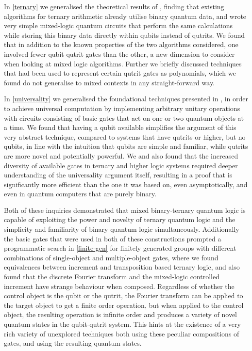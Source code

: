 In \autoref{ternary} we generalised the theoretical results of \cite{arithmetics}, finding that existing algorithms for ternary arithmetic already utilise binary quantum data, and wrote very simple mixed-logic quantum circuits that perform the same calculations while storing this binary data directly within qubits instead of qutrits. We found that in addition to the known properties of the two algorithms considered, one involved fewer qubit-qutrit gates than the other, a new dimension to consider when looking at mixed logic algorithms. Further we briefly discussed techniques that had been used to represent certain qutrit gates as polynomials, which we found do not generalise to mixed contexts in any straight-forward way.

In \autoref{universality} we generalised the foundational techniques presented in \cite{cnot-decomposition, textbook}, in order to achieve universal computation by implementing arbitrary unitary operations with circuits consisting of basic gates that act on one or two quantum objects at a time. We found that having a qubit available simplifies the argument of this very abstract technique, compared to systems that have qutrits or higher, but no qubits, in line with the intuition that qubits are simple and familiar, while qutrits are more novel and potentially powerful. We and also found that the increased diversity of available gates in ternary and higher logic systems required deeper understanding of the universality argument itself, resulting in a proof that is significantly more efficient than the one it was based on, even asymptotically, and even in quantum computers that are purely binary.

Both of these inquiries demonstrated that mixed binary-ternary quantum logic is capable of exploiting the power and novelty of ternary quantum logic and the simplicity and familiarity of binary quantum logic simultaneously. Additionally the basic gates that were used in both of these constructions prompted a programmatic search in \autoref{finite-gen} for finitely generated groups with different combinations of single-object and multiple-object gates, where we found equivalences between increment and transposition based ternary logic, and also found that the discrete Fourier transform and the mixed-logic controlled increment have strange behaviour when composed. Regardless of whether the control object is the qubit or the qutrit, the Fourier transform can be applied to the target object to get a finite order operation, but when applied to the control object, the resulting operation is infinite order and produces a variety of novel quantum states in the qubit-qutrit system. This hints at the existence of a very rich variety of unexplored techniques both using these peculiar compositions of gates, and using the resulting quantum states.

